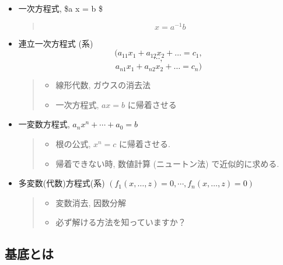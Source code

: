 \documentclass[a4j]{jarticle}
\begin{document}
\begin{itemize}
\item 一次方程式, \$a x = b \$

\begin{quote}
$$x = a^{-1} b$$
\end{quote}

\item 連立一次方程式 (系)
$$(a_{11} x_1 + a_{12} x_2 + \ldots = c_1,$$$$\cdots,$$
$$a_{n1} x_1 + a_{n2} x_2 + \ldots = c_n)$$

\begin{quote}


\begin{itemize}
\item 線形代数, ガウスの消去法

\item 一次方程式, \(a x = b\) に帰着させる
\end{itemize}
\end{quote}

\item 一変数方程式, \(a_n x^n + \cdots + a_0 = b\)

\begin{quote}


\begin{itemize}
\item 根の公式, \(x^n = c\) に帰着させる.

\item 帰着できない時, 数値計算 (ニュートン法) で近似的に求める.
\end{itemize}
\end{quote}

\item 多変数(代数)方程式(系)
\((f_1(x, \ldots, z) =0, \cdots, f_n(x, \ldots, z) =0)\)

\begin{quote}


\begin{itemize}
\item 変数消去, 因数分解

\item 必ず解ける方法を知っていますか？
\end{itemize}
\end{quote}
\end{itemize}

\subsection{基底とは}
\label{sec:org6559507}
\end{document}

